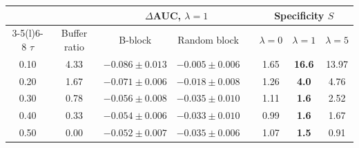 \begin{tabular}{@{}cc ccc ccc@{}}
\toprule
 & & \multicolumn{3}{c}{$\Delta$AUC, $\lambda=1$} & \multicolumn{3}{c}{Specificity $S$} \\
\cmidrule(lr){3-5}\cmidrule(l){6-8}
$\tau$ & Buffer ratio & B-block & Random block & & $\lambda=0$ & $\lambda=1$ & $\lambda=5$ \\
\midrule
0.10 & 4.33 & $-0.086\pm0.013$ & $-0.005\pm0.006$ & & 1.65 & \textbf{16.6} & 13.97 \\
0.20 & 1.67 & $-0.071\pm0.006$ & $-0.018\pm0.008$ & & 1.26 & \textbf{4.0} & 4.76 \\
0.30 & 0.78 & $-0.056\pm0.008$ & $-0.035\pm0.010$ & & 1.11 & \textbf{1.6} & 2.52 \\
0.40 & 0.33 & $-0.054\pm0.006$ & $-0.033\pm0.010$ & & 0.99 & \textbf{1.6} & 1.67 \\
0.50 & 0.00 & $-0.052\pm0.007$ & $-0.035\pm0.006$ & & 1.07 & \textbf{1.5} & 0.91 \\
\bottomrule
\end{tabular}